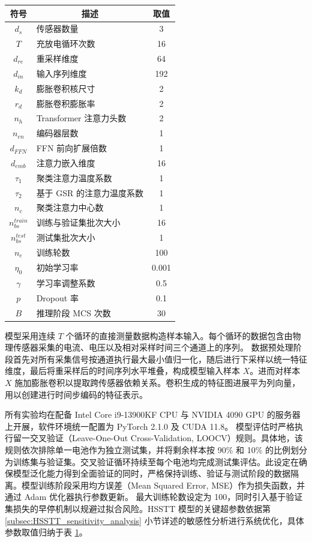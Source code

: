 \begin{table}[htbp]
\centering
{}
\label{tab:HSSTT_hyperparams}
\begin{tabular}{clc}
\toprule
符号 & \multicolumn{1}{c}{描述} & 取值 \\
\midrule
$d_{s}$ & 传感器数量 & 3 \\
$T$ & 充放电循环次数 & 16 \\
$d_{re}$ & 重采样维度 & 64 \\
$d_{in}$ & 输入序列维度 & 192 \\
$k_{d}$ & 膨胀卷积核尺寸 & 2 \\
$r_{d}$ & 膨胀卷积膨胀率 & 2 \\
$n_{h}$ & Transformer 注意力头数 & 2 \\
$n_{en}$ & 编码器层数 & 1 \\
$d_{FFN}$ & FFN 前向扩展倍数 & 1 \\
$d_{emb}$ & 注意力嵌入维度 & 16 \\
$\tau_{1}$ & 聚类注意力温度系数 & 1 \\
$\tau_{2}$ & 基于 GSR 的注意力温度系数 & 1 \\
$n_{c}$ & 聚类注意力中心数 & 1 \\
$n_{bs}^{train}$ & 训练与验证集批次大小 & 16 \\
$n_{bs}^{test}$ & 测试集批次大小 & 1 \\
$n_{e}$ & 训练轮数 & 100 \\
$\eta_{0}$ & 初始学习率 & 0.001 \\
$\gamma$ & 学习率调整系数 & 0.5 \\
$p$      & Dropout 率 & 0.1 \\
$B$      & 推理阶段 MCS 次数 & 30 \\
\bottomrule
\end{tabular}
\end{table}

模型采用连续 $T$ 个循环的直接测量数据构造样本输入。每个循环的数据包含由物理传感器采集的电流、电压以及相对采样时间三个通道上的序列。
数据预处理阶段首先对所有采集信号按通道执行最大最小值归一化，随后进行下采样以统一特征维度，最后将重采样后的时间序列水平堆叠，构成模型输入样本 $X$。进而对样本 $X$ 施加膨胀卷积以提取跨传感器依赖关系。卷积生成的特征图进展平为列向量，用以创建进行时间步编码的特征表示。

所有实验均在配备 Intel Core i9-13900KF CPU 与 NVIDIA 4090 GPU 的服务器上开展，软件环境统一配置为 PyTorch 2.1.0 及 CUDA 11.8。
模型评估时严格执行留一交叉验证（Leave-One-Out Cross-Validation, LOOCV）规则。具体地，该规则依次排除单一电池作为独立测试集，并将剩余样本按 90\% 和 10\% 的比例划分为训练集与验证集。交叉验证循环持续至每个电池均完成测试集评估。此设定在确保模型泛化能力得到全面验证的同时，严格保持训练、验证与测试阶段的数据隔离。模型训练阶段采用均方误差（Mean Squared Error, MSE）作为损失函数，并通过 Adam 优化器执行参数更新。
最大训练轮数设定为 100，同时引入基于验证集损失的早停机制以规避过拟合风险。HSSTT 模型的关键超参数依据第 \ref{subsec:HSSTT_sensitivity_analysis} 小节详述的敏感性分析进行系统优化，具体参数取值归纳于表 \ref{tab:HSSTT_hyperparams}。

